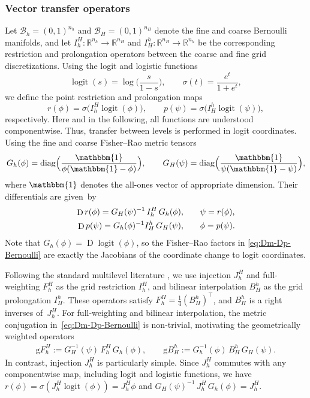 \documentclass[11pt,reqno]{amsart}
\theoremstyle{plain}
\newcommand\R{\mathbb R}
\DeclareMathOperator{\Drm}{D}
\DeclareMathOperator{\logit}{logit}
\DeclareMathOperator{\diag}{diag}
\def\onebb{\mathbbm{1}}
\newcommand\calB{\mathcal B}
\begin{document}
		\subsubsection{Vector transfer operators}
		\label{ssec:CC_vector_transport}
		Let $\calB_h=(0,1)^{n_h}$ and $\calB_H=(0,1)^{n_H}$ denote the fine and coarse
		Bernoulli manifolds, and let $I_h^H:\R^{n_h}\to\R^{n_H}$ and $I_H^h:\R^{n_H}\to\R^{n_h}$ be the corresponding restriction and prolongation operators between the coarse and fine grid discretizations. Using the logit and logistic functions 
		\begin{equation*}
			\logit(s)=\log\!\Big(\frac{s}{1-s}\Big), \qquad
			\sigma(t)=\frac{e^t}{1+e^t},
		\end{equation*}
		we define the point restriction and prolongation maps
		\[
		r(\phi)=\sigma\big(I^H_h\logit(\phi)\big), \qquad p(\psi)=\sigma\big(I_H^h\logit(\psi)\big),
		\]
		respectively. Here and in the following, all functions are understood componentwise. Thus, transfer between levels is performed in logit coordinates. Using the fine and coarse Fisher--Rao metric tensors
		\begin{align*}
			G_h(\phi)=\diag\!\Big(\frac{\onebb}{\phi(\onebb-\phi)}\Big),
			\qquad
			G_H(\psi)=\diag\!\Big(\frac{\onebb}{\psi(\onebb-\psi)}\Big),
		\end{align*}
		where $\onebb$ denotes the all-ones vector of appropriate dimension.
		Their differentials are given~by
		\begin{align} \label{eq:Dm-Dp-Bernoulli}
			\Drm r(\phi) = G_H(\psi)^{-1}\, I^H_h\, G_h(\phi), & \qquad \psi = r(\phi),\\
			\Drm p(\psi) = G_h(\phi)^{-1} I^h_H\, G_H(\psi), & \qquad \phi = p(\psi). \notag
		\end{align}
		Note that $G_h(\phi)=\Drm\logit(\phi)$, so the Fisher--Rao factors in \eqref{eq:Dm-Dp-Bernoulli} are exactly the Jacobians of the coordinate change to logit coordinates.
		
		Following the standard multilevel literature \cite{BriHM00}, we use injection $J^H_h$  and full-weighting $F^H_h$ as the grid restriction $I^H_h$, and bilinear interpolation $B^h_H$ as the grid prolongation $I^h_H$. These operators satisfy $F_h^H=\frac{1}{4}(B_H^h)^\top$, and $B^h_H$ is a right inverses of~$J^H_h$. For full-weighting and bilinear interpolation, the metric conjugation in~\eqref{eq:Dm-Dp-Bernoulli} is non-trivial, motivating the geometrically weighted operators
		\begin{align*}
			\mathrm{g}F^H_h := G_H^{-1}(\psi)\,F^H_h\,G_h(\phi), \qquad
			\mathrm{g}B^h_H := G_h^{-1}(\phi)\,B^h_H\,G_H(\psi).
		\end{align*}
		In contrast, injection $J^H_h$ is particularly simple. Since $J^H_h$ commutes with any componentwise map, including logit and logistic functions, we have $r(\phi) = \sigma (J^H_h \logit(\phi)) = J^H_h \phi$ and $G_H(\psi)^{-1}\,J^H_h\,G_h(\phi) = J^H_h$.
		
\end{document}
